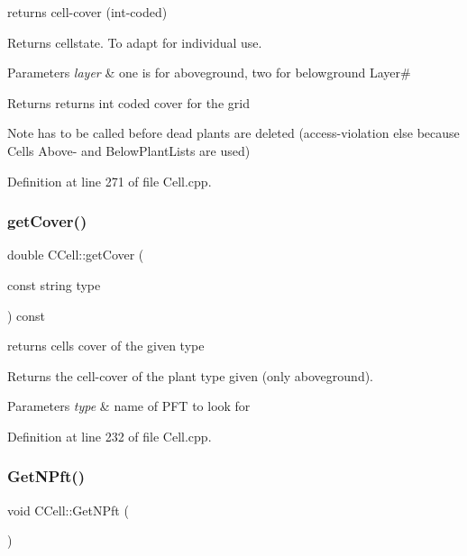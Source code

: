 returns cell-\/cover (int-\/coded) 

Returns cellstate. To adapt for individual use. 
\begin{DoxyParams}{Parameters}
{\em layer} & one is for aboveground, two for belowground Layer\# \\
\hline
\end{DoxyParams}
\begin{DoxyReturn}{Returns}
returns int coded cover for the grid 
\end{DoxyReturn}
\begin{DoxyNote}{Note}
has to be called before dead plants are deleted (access-\/violation else because Cell\textquotesingle{}s Above-\/ and Below\+Plant\+Lists are used) 
\end{DoxyNote}


Definition at line 271 of file Cell.\+cpp.

\mbox{\label{class_c_cell_ae47dee0b8740b16d54d5dd5f7e56a910}} 
\subsubsection{\texorpdfstring{getCover()}{getCover()}\hspace{0.1cm}{\footnotesize\ttfamily [2/2]}}
{\footnotesize\ttfamily double C\+Cell\+::get\+Cover (\begin{DoxyParamCaption}\item[{const string}]{type }\end{DoxyParamCaption}) const}



returns cell\textquotesingle{}s cover of the given type 

Returns the cell-\/cover of the plant type given (only aboveground). 
\begin{DoxyParams}{Parameters}
{\em type} & name of P\+FT to look for \\
\hline
\end{DoxyParams}


Definition at line 232 of file Cell.\+cpp.

\mbox{\label{class_c_cell_a5a6f6346ee1e347e67ceddffd7295e6a}} 
\subsubsection{\texorpdfstring{GetNPft()}{GetNPft()}}
{\footnotesize\ttfamily void C\+Cell\+::\+Get\+N\+Pft (\begin{DoxyParamCaption}{ }\end{DoxyParamCaption})}



